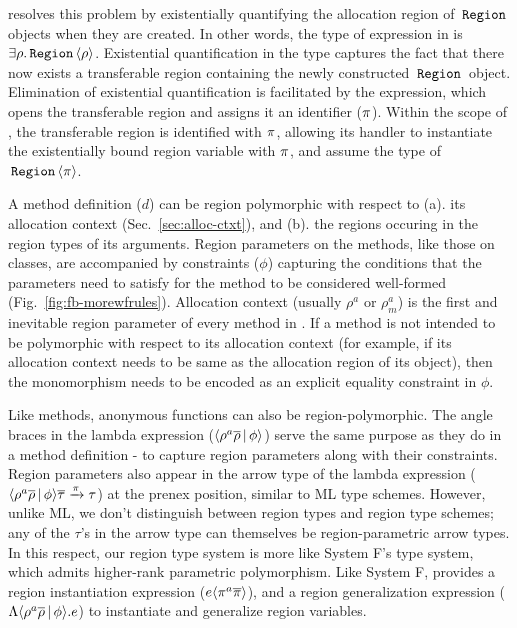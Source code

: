 \FB resolves this problem by existentially quantifying the allocation
region of $\,{\tt Region}\,$ objects when they are created. In other words, the
type of  expression in \FB is
$\exists\rho.\,{\tt Region}\,\langle \rho \rangle$. Existential quantification in the
type captures the fact that there now exists a transferable region
containing the newly constructed $\,{\tt Region}\,$ object. Elimination of
existential quantification is facilitated by the  expression,
which opens the transferable region and assigns it an identifier
($\pi$).  Within the scope of , the transferable region is
identified with $\pi$, allowing its handler to instantiate the
existentially bound region variable with $\pi$, and assume the type
of $\,{\tt Region}\,\langle \pi \rangle$.

A method definition ($d$) can be region polymorphic with respect to
(a). its allocation context (Sec.~\ref{sec:alloc-ctxt}), and (b). the
regions occuring in the region types of its arguments.  Region
parameters on the methods, like those on classes, are accompanied by
constraints ($\phi$) capturing the conditions that the parameters need
to satisfy for the method to be considered well-formed
(Fig.~\ref{fig:fb-morewfrules}). Allocation context (usually $\rho^a$
or $\rho^a_m$) is the first and inevitable region parameter of every
method in \FB. If a method is not intended to be polymorphic with
respect to its allocation context (for example, if its allocation
context needs to be same as the allocation region of its object), then
the monomorphism needs to be encoded as an explicit equality
constraint in $\phi$.  

Like methods, anonymous functions can also be region-polymorphic. 
The angle braces in the lambda expression ($\langle \rho^a\overline{\rho} \,|\,
\phi \rangle$) serve the same purpose as they do in a method definition - to
capture region parameters along with their constraints. Region
parameters also appear in the arrow type of the lambda expression 
($\langle \rho^a\overline{\rho} \,|\, \phi \rangle\overline{\tau} \xrightarrow{\pi} 
\tau$) at the prenex position, similar to ML type schemes. However,
unlike ML, we don't distinguish between region types and region type
schemes; any of the $\tau$'s in the arrow type can themselves be
region-parametric arrow types. In this respect, our region type system
is more like System F's type system, which admits higher-rank
parametric polymorphism. Like System F, \FB provides a region
instantiation expression ($e\langle \pi^a\overline{\pi} \rangle$), and a region
generalization expression ($\Lambda\langle \rho^a\overline{\rho} \,|\,
\phi \rangle.e$) to instantiate and generalize region variables. 


